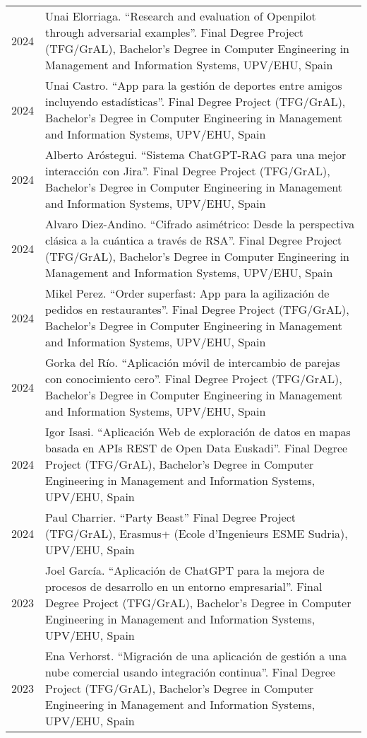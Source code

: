 \documentclass[11pt,fullpage]{article}
\begin{document}
\begin{longtable}{p{0.5in}|p{5.5in}}
2024 & Unai Elorriaga. ``Research and evaluation of Openpilot through adversarial examples''. Final Degree Project (TFG/GrAL), Bachelor's Degree in Computer Engineering in Management and Information Systems, UPV/EHU, Spain \\ 
2024 & Unai Castro. ``App para la gestión de deportes entre amigos incluyendo estadísticas''. Final Degree Project (TFG/GrAL), Bachelor's Degree in Computer Engineering in Management and Information Systems, UPV/EHU, Spain \\   
2024 & Alberto Aróstegui. ``Sistema ChatGPT-RAG para una mejor interacción con Jira''. Final Degree Project (TFG/GrAL), Bachelor's Degree in Computer Engineering in Management and Information Systems, UPV/EHU, Spain \\ 
2024 & Alvaro Diez-Andino. ``Cifrado asimétrico: Desde la perspectiva clásica a la cuántica a través de RSA''. Final Degree Project (TFG/GrAL), Bachelor's Degree in Computer Engineering in Management and Information Systems, UPV/EHU, Spain \\ 
2024 & Mikel Perez. ``Order superfast: App para la agilización de pedidos en restaurantes''. Final Degree Project (TFG/GrAL), Bachelor's Degree in Computer Engineering in Management and Information Systems, UPV/EHU, Spain \\   
2024 & Gorka del Río. ``Aplicación móvil de intercambio de parejas con conocimiento cero''. Final Degree Project (TFG/GrAL), Bachelor's Degree in Computer Engineering in Management and Information Systems, UPV/EHU, Spain \\ 
2024 & Igor Isasi. ``Aplicación Web de exploración de datos en mapas basada en APIs REST de Open Data Euskadi''. Final Degree Project (TFG/GrAL), Bachelor's Degree in Computer Engineering in Management and Information Systems, UPV/EHU, Spain\\  
2024 & Paul Charrier. ``Party Beast'' Final Degree Project (TFG/GrAL), Erasmus+ (Ecole d'Ingenieurs ESME Sudria), UPV/EHU, Spain \\
2023 & Joel García. ``Aplicación de ChatGPT para la mejora de procesos de desarrollo en un entorno empresarial''. Final Degree Project (TFG/GrAL), Bachelor's Degree in Computer Engineering in Management and Information Systems, UPV/EHU, Spain \\
2023 & Ena Verhorst. ``Migración de una aplicación de gestión a una nube comercial usando integración continua''. Final Degree Project (TFG/GrAL), Bachelor's Degree in Computer Engineering in Management and Information Systems, UPV/EHU, Spain \\

\end{longtable}
\end{document}
